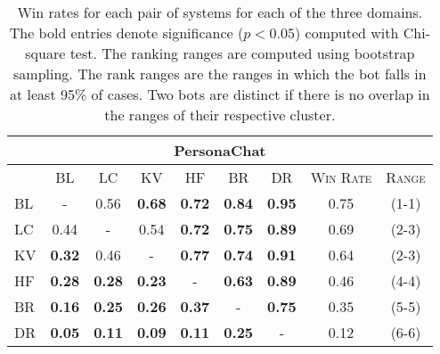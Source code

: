 \begin{table}[h!]
{\begin{tabular}{l|cccccc|cc}
\multicolumn{9}{c}{PersonaChat} \\
\toprule
\textsc{} & \textsc{BL}& \textsc{LC} &  \textsc{KV} &  \textsc{HF} & \textsc{BR}  & \textsc{DR} &\textsc{Win Rate} & \textsc{Range}\\
\hline 
\textsc{BL}& - & 0.56 & \textbf{0.68} & \textbf{0.72} & \textbf{0.84} & \textbf{0.95}&  0.75 & (1-1) \\
\textsc{LC}& 0.44 & - & 0.54 & \textbf{0.72} & \textbf{0.75} & \textbf{0.89} & 0.69  & (2-3)\\
\textsc{KV}& \textbf{0.32} & 0.46 & - & \textbf{0.77} & \textbf{0.74} & \textbf{0.91} & 0.64 & (2-3)\\
\textsc{HF}& \textbf{0.28} & \textbf{0.28} & \textbf{0.23} & - & \textbf{0.63}& \textbf{0.89} & 0.46& (4-4)\\
\textsc{BR}& \textbf{0.16} & \textbf{0.25} & \textbf{0.26} & \textbf{0.37} & - & \textbf{0.75} & 0.35& (5-5) \\
\textsc{DR}& \textbf{0.05} & \textbf{0.11} & \textbf{0.09} & \textbf{0.11}& \textbf{0.25} & - & 0.12& (6-6) \\
\bottomrule
\end{tabular}
}
\caption{Win rates for each pair of systems for each of the three domains. The bold entries denote significance ($p < 0.05$) computed with Chi-square test. The ranking ranges are computed using bootstrap sampling. The rank ranges are the ranges in which the bot falls in at least 95\% of cases. Two bots are distinct if there is no overlap in the ranges of their respective cluster.}
\label{tab:win_rates}
\end{table}